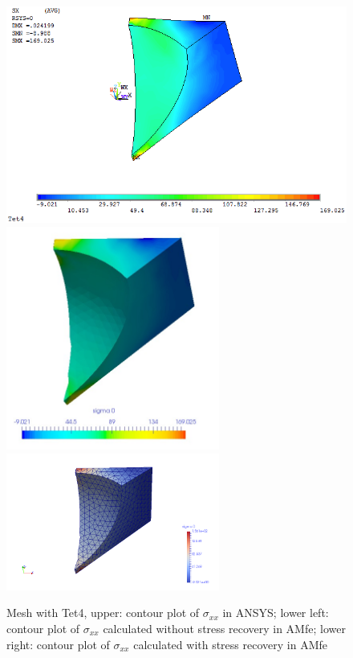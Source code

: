 \begin{figure}[htbp]
	\begin{center}
		\includegraphics[width=13cm,clip]{Tet4Sxx.png} 	
		\includegraphics[width=7cm,clip]{Tet4SxxPD.png} 	
		\includegraphics[width=7cm,clip]{Tet4SxxP.png} 		
		\caption{Mesh with Tet4, upper: contour plot of $\sigma_{xx}$ in ANSYS; lower left: contour plot of $\sigma_{xx}$ calculated without stress recovery in AMfe; lower right: contour plot of $\sigma_{xx}$ calculated with stress recovery in AMfe} \label{fig: Tet4_Sxx}
	\end{center}
\end{figure}
\clearpage 

